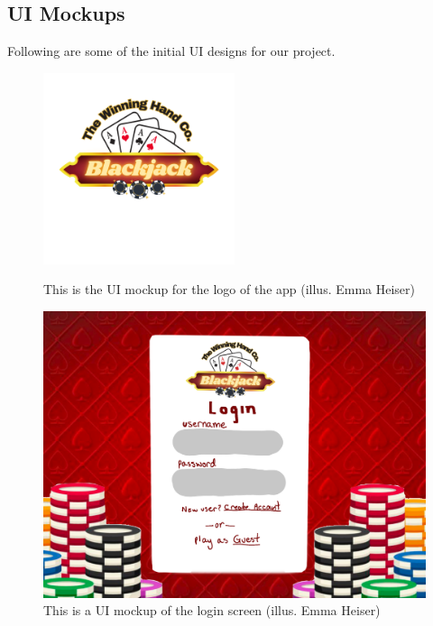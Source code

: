 \pagebreak

\subsection{UI Mockups}
Following are some of the initial UI designs for our project.

\begin{figure}[hbt!]
    \centering
    \includegraphics[width=0.5\textwidth]{figures/Blackjack.png} \\
    \caption{This is the UI mockup for the logo of the app (illus. Emma Heiser)}
    \label{fig:logo}
\end{figure}

\begin{figure}[hbt!]
    \centering
    \includegraphics[width=0.75\linewidth]{figures/login.png}
    \caption{This is a UI mockup of the login screen (illus. Emma Heiser)}
    \label{fig:login}
\end{figure}

